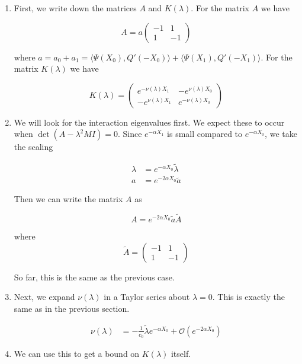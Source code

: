 \documentclass[12pt]{article}
\begin{document}
\begin{enumerate}

\item First, we write down the matrices $A$ and $K(\lambda)$. For the matrix $A$ we have

\[
A = a \begin{pmatrix}
-1 & 1 \\
1 & -1
\end{pmatrix}
\]

where $a = a_0 + a_1 = \langle \Psi(X_0), Q'(-X_0) \rangle + \langle \Psi(X_1), Q'(-X_1) \rangle$. For the matrix $K(\lambda)$ we have

\begin{equation}
K(\lambda) = 
\begin{pmatrix}
e^{-\nu(\lambda)X_1} & -e^{\nu(\lambda)X_0} \\
-e^{\nu(\lambda)X_1} & e^{-\nu(\lambda)X_0}
\end{pmatrix}
\end{equation}

\item We will look for the interaction eigenvalues first. We expect these to occur when $\det(A - \lambda^2 M I) = 0$. Since $e^{-\alpha X_1}$ is small compared to $e^{-\alpha X_0}$, we take the scaling

\begin{align*}
\lambda &= e^{-\alpha X_0} \tilde{\lambda} \\
a &= e^{-2 \alpha X_0} \tilde{a}
\end{align*}

Then we can write the matrix $A$ as 

\[
A = e^{-2 \alpha X_0} \tilde{a} \tilde{A}
\]

where
\[
\tilde{A} = \begin{pmatrix}
-1 & 1 \\
1 & -1
\end{pmatrix}
\]

So far, this is the same as the previous case.

\item Next, we expand $\nu(\lambda)$ in a Taylor series about $\lambda = 0$. This is exactly the same as in the previous section.

\begin{align*}
\nu(\lambda) &= -\frac{1}{c_0}\tilde{\lambda}e^{-\alpha X_0} + \mathcal{O}(e^{-2 \alpha X_0})
\end{align*}

\item We can use this to get a bound on $K(\lambda)$ itself.


\end{enumerate}
\end{document}
